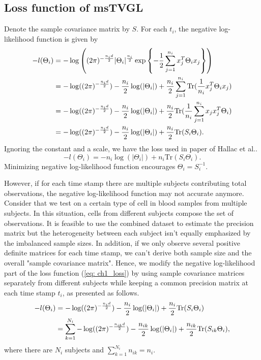 \subsection{Loss function of msTVGL}
Denote the sample covariance matrix by $S$. 
For each $t_i$, the negative log-likelihood function is given by 
\begin{align}
    \label{eq: ch1_loss}
    -l(\Theta_i) &= -\log\left((2\pi)^{-\frac{n_id}{2}}|\Theta_i|^{\frac{n_i}{2}}\exp\left\{-\frac{1}{2}\sum_{j=1}^{n_i}x_j^T\Theta_ix_j\right\}\right) \notag \\
               &= -\log((2\pi)^{-\frac{n_id}{2}}) - \frac{n_i}{2}\log(|\Theta_i|) +\frac{n_i}{2}\sum_{j=1}^{n_i}\text{Tr}(\frac{1}{n_i}x_j^T\Theta_ix_j) \notag \\
               &= -\log((2\pi)^{-\frac{n_id}{2}}) - \frac{n_i}{2}\log(|\Theta_i|) +\frac{n_i}{2}\text{Tr}(\frac{1}{n_i}\sum_{j=1}^{n_i}x_jx_j^T\Theta_i) \notag \\
               &= -\log((2\pi)^{-\frac{n_id}{2}}) - \frac{n_i}{2}\log(|\Theta_i|) +\frac{n_i}{2}\text{Tr}(S_i\Theta_i). 
\end{align}
Ignoring the constant and a scale, we have the loss used in paper of Hallac et al.\cite{hallac2017networkinferencetimevaryinggraphical}.
\begin{equation}
    \label{eq: ch1_loss_paper}
    -l(\Theta_i) = - n_i\log(|\Theta_i|) +n_i\text{Tr}(S_i\Theta_i). 
\end{equation}
Minimizing negative log-likelihood function encourages $\Theta_i=S_i^{-1}$. 

However, if for each time stamp there are multiple subjects contributing total observations, 
the negative log-likelihood function may not accurate anymore. 
Consider that we test on a certain type of cell in blood samples from multiple subjects. 
In this situation, cells from different subjects compose the set of observations. 
It is feasible to use the combined dataset to estimate the precision matrix but the heterogeneity between each subject isn't equally emphasized by the imbalanced sample sizes. 
In addition, if we only observe several positive definite matrices for each time stamp, 
we can't derive both sample size and the overall "sample covariance matrix". 
Hence, we modify the negative log-likelihood part of the loss function (\ref{eq: ch1_loss}) by 
using sample covariance matrices separately from different subjects while keeping a common precision matrix at each time stamp $t_i$,  
as presented as follows. 
\begin{align}
    \label{eq: ch1_loss_modify1}
    -l(\Theta_i) &= -\log((2\pi)^{-\frac{n_id}{2}}) - \frac{n_i}{2}\log(|\Theta_i|) +\frac{n_i}{2}\text{Tr}(S_i\Theta_i) \notag \\
                 &= \sum_{k=1}^{N_i}-\log((2\pi)^{-\frac{n_{ik}d}{2}})-\frac{n_{ik}}{2}\log(|\Theta_i|)+\frac{n_{ik}}{2}\text{Tr}(S_{ik}\Theta_i),
\end{align}
where there are $N_i$ subjects and $\sum_{k=1}^{N_i}n_{ik}=n_i$.

